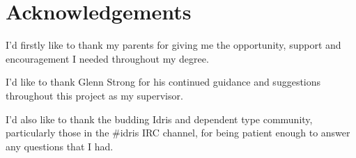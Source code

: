 \chapter*{Acknowledgements}
I'd firstly like to thank my parents for giving me the opportunity, support and
encouragement I needed throughout my degree.

I'd like to thank Glenn Strong for his continued guidance and suggestions
throughout this project as my supervisor.

I'd also like to thank the budding Idris and dependent type community,
particularly those in the \#idris IRC channel, for being patient enough to answer
any questions that I had.
